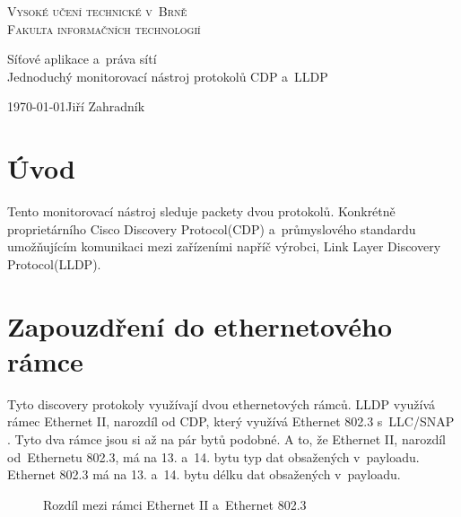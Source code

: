 \documentclass[a4paper,12pt]{article}
\begin{document}
		\begin{titlepage}
			\begin{center}
				\Huge
				\textsc{Vysoké učení technické v~Brně\\
					\huge Fakulta informačních technologií\\}
				
				
				\Large Síťové aplikace a~práva sítí\\
				\Huge 	Jednoduchý monitorovací nástroj protokolů CDP a~LLDP
				
			\end{center}
			\Large {\today \hfill Jiří Zahradník}
		\end{titlepage}
	
	\pagebreak
	
	\tableofcontents
	
	
	\pagebreak
	
	\section{Úvod}
		Tento monitorovací nástroj sleduje packety dvou protokolů. Konkrétně proprietárního
		Cisco Discovery Protocol(CDP) a~průmyslového standardu umožňujícím komunikaci mezi zařízeními napříč výrobci, Link Layer Discovery Protocol(LLDP).
		
	\section{Zapouzdření do ethernetového rámce}
		Tyto discovery protokoly využívají dvou ethernetových rámců. LLDP využívá rámec Ethernet II, narozdíl od CDP, který využívá Ethernet 802.3 s~LLC/SNAP \cite{wireshark:ethernet}.
		Tyto dva rámce jsou si až na pár bytů podobné. A to, že Ethernet II, narozdíl od~Ethernetu 802.3, má na 13. a~14. bytu typ dat obsažených v~payloadu. Ethernet 802.3 má na 13. a~14. bytu délku dat obsažených v~payloadu.
		
		\begin{figure}[h]	
			\begin{center}
				\caption{Rozdíl mezi rámci Ethernet II a~Ethernet 802.3}
				\label{pic:etherVsEther}
			\end{center}
		\end{figure}
		
\end{document}
